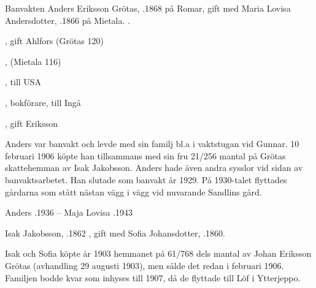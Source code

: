 Banvakten Anders Eriksson Grötas, .1868 på Romar, gift med Maria	Lovisa Andersdotter, .1866 på Mietala.                .
\begin{jhchildren}
  \item {}, gift Ahlfors (Grötas 120)
  \item {}
  \item {}, (Mietala 116)
  \item {}, till USA
  \item {}
  \item {}, bokförare, till Ingå
  \item {}, gift Eriksson
\end{jhchildren}
Anders var banvakt och levde med sin familj bl.a i vaktstugan vid Gunnar. 10 februari 1906 köpte han tillsammans med sin fru 21/256 mantal på Grötas skattehemman av Isak Jakobsson. Anders hade även andra sysslor vid sidan av banvaktsarbetet. Han slutade som banvakt år 1929. På 1930-talet flyttades gårdarna som stått nästan vägg i vägg vid nuvarande Sandlins gård.

Anders .1936  --  Maja Lovisa .1943


Isak Jakobsson, .1862 , gift med Sofia Johansdotter, .1860.
\begin{jhchildren}
  \item {}
  \item {}
  \item {}
  \item {}
  \item {}
\end{jhchildren}
Isak och Sofia köpte år 1903 hemmanet på 61/768 dels mantal av Johan Eriksson Grötas (avhandling 29 augusti 1903), men sålde det redan i februari 1906. Familjen bodde kvar som inhyses till 1907, då de flyttade till Löf i Ytterjeppo.


